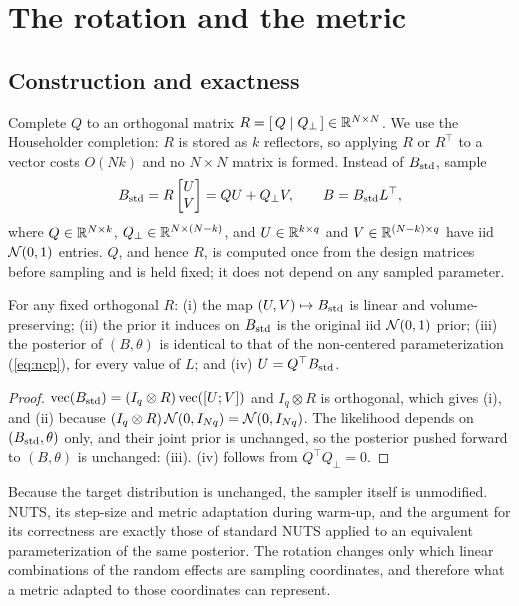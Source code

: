 \section{The rotation and the metric}\label{sec:rotation}

\subsection{Construction and exactness}

Complete $Q$ to an orthogonal matrix $R = [\,Q \mid Q_{\perp}\,] \in
\mathbb{R}^{N \times N}$. We use the Householder completion: $R$ is stored as $k$
reflectors, so applying $R$ or $R^{\top}$ to a vector costs $O(Nk)$ and no
$N \times N$ matrix is formed. Instead of $B_{\mathrm{std}}$, sample
\begin{equation}\label{eq:rot}
B_{\mathrm{std}} = R \begin{bmatrix} U \\ V \end{bmatrix} = Q U + Q_{\perp} V,
\qquad B = B_{\mathrm{std}} L^{\top},
\end{equation}
where $Q \in \mathbb{R}^{N \times k}$, $Q_{\perp} \in \mathbb{R}^{N \times (N-k)}$, and
$U \in \mathbb{R}^{k \times q}$ and $V \in \mathbb{R}^{(N-k) \times q}$ have iid $\mathcal{N}(0,1)$
entries. $Q$, and hence $R$, is computed once from the design matrices
before sampling and is held fixed; it does not depend on any sampled
parameter.

\begin{proposition}[Exactness]\label{prop:exact}
For any fixed orthogonal $R$: (i) the map $(U, V) \mapsto B_{\mathrm{std}}$ is linear
and volume-preserving; (ii) the prior it induces on $B_{\mathrm{std}}$ is the original
iid $\mathcal{N}(0,1)$ prior; (iii) the posterior of $(B, \theta)$ is identical to
that of the non-centered parameterization (\ref{eq:ncp}), for every value of
$L$; and (iv) $U = Q^{\top} B_{\mathrm{std}}$.
\end{proposition}

\begin{proof}
$\operatorname{vec}(B_{\mathrm{std}}) = (I_q \otimes R)\operatorname{vec}([U; V])$
and $I_q \otimes R$ is orthogonal, which gives (i), and (ii) because
$(I_q \otimes R)\,\mathcal{N}(0, I_{Nq}) = \mathcal{N}(0, I_{Nq})$. The likelihood depends
on $(B_{\mathrm{std}}, \theta)$ only, and their joint prior is unchanged, so the
posterior pushed forward to $(B, \theta)$ is unchanged: (iii). (iv)
follows from $Q^{\top} Q_{\perp} = 0$.
\end{proof}

Because the target distribution is unchanged, the sampler itself is
unmodified. NUTS, its step-size and metric adaptation during warm-up, and
the argument for its correctness are exactly those of standard NUTS applied
to an equivalent parameterization of the same posterior. The rotation
changes only which linear combinations of the random effects are sampling
coordinates, and therefore what a metric adapted to those coordinates can
represent.


